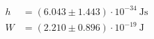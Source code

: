 \begin{align*}\\
h &= (6.043 \pm 1.443) \cdot 10^{-34}~\text{Js}\\
W &= (2.210\pm 0.896) \cdot 10^{-19}~\text{J}
\\\end{align*}
